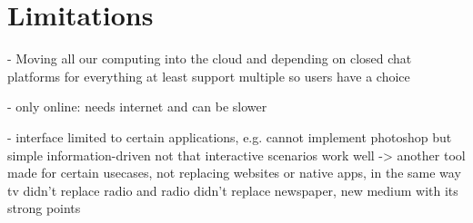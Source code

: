 \section{Limitations}

- Moving all our computing into the cloud and depending on closed chat platforms for everything
    at least support multiple so users have a choice

- only online: needs internet and can be slower

- interface limited to certain applications, e.g. cannot implement photoshop
  but simple information-driven  not that interactive scenarios work well
  -> another tool made for certain usecases, not replacing websites or native apps,
  in the same way tv didn't replace radio and radio didn't replace newspaper,
  new medium with its strong points

